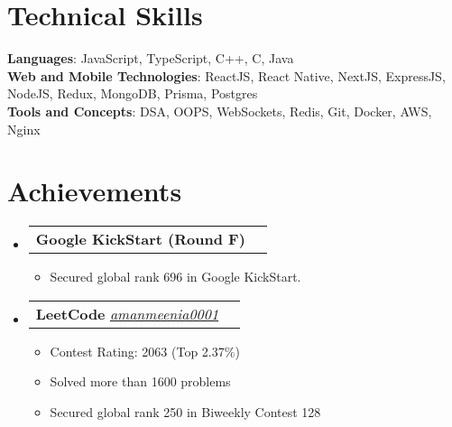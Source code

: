 \documentclass[letterpaper,11pt]{article}
\makeatletter
\newcommand{\resumeItem}[1]{
  \item\small{
    {#1 \vspace{-2pt}}
  }
}
\newcommand{\resumeProjectHeading}[2]{
    \item
    \begin{tabular*}{1.001\textwidth}{l@{\extracolsep{\fill}}r}
      \small#1 & \textbf{\small #2}\\
    \end{tabular*}\vspace{-7pt}
}
\newcommand{\resumeSubHeadingListStart}{\begin{itemize}[leftmargin=0.0in, label={}]}
\newcommand{\resumeSubHeadingListEnd}{\end{itemize}}
\newcommand{\resumeItemListStart}{\begin{itemize}}
\newcommand{\resumeItemListEnd}{\end{itemize}\vspace{-5pt}}
\makeatother
\begin{document}
%
\section{Technical Skills}
 \begin{itemize}[leftmargin=0.15in, label={}]
    \small{\item{
     \textbf{Languages}{: JavaScript, TypeScript, C++, C, Java} \\
     \textbf{Web and Mobile Technologies}{: ReactJS, React Native, NextJS, ExpressJS, NodeJS, Redux, MongoDB, Prisma, Postgres} \\
     \textbf{Tools and Concepts}{: DSA, OOPS, WebSockets, Redis, Git, Docker, AWS, Nginx} \\
    }}
 \end{itemize}
 \vspace{-16pt}



\section{Achievements}
    \vspace{-5pt}
    \resumeSubHeadingListStart
      \resumeProjectHeading
          {\textbf{Google KickStart (Round F)}}{}
          \resumeItemListStart
            \resumeItem{Secured global rank 696 in Google KickStart.}
          \resumeItemListEnd
          \vspace{-18pt}       \resumeProjectHeading
          {\textbf{LeetCode} 
    \href{https://leetcode.com/u/AmanMeenia0001/}{\textit{amanmeenia0001}}}{}
          \resumeItemListStart
            \resumeItem{Contest Rating: 2063 (Top 2.37\%)}
            \resumeItem{Solved more than 1600 problems}
            \resumeItem{Secured global rank 250 in Biweekly Contest 128}
          \resumeItemListEnd
          \vspace{-13pt} %
    \resumeSubHeadingListEnd
\vspace{-13pt} %
\end{document}
